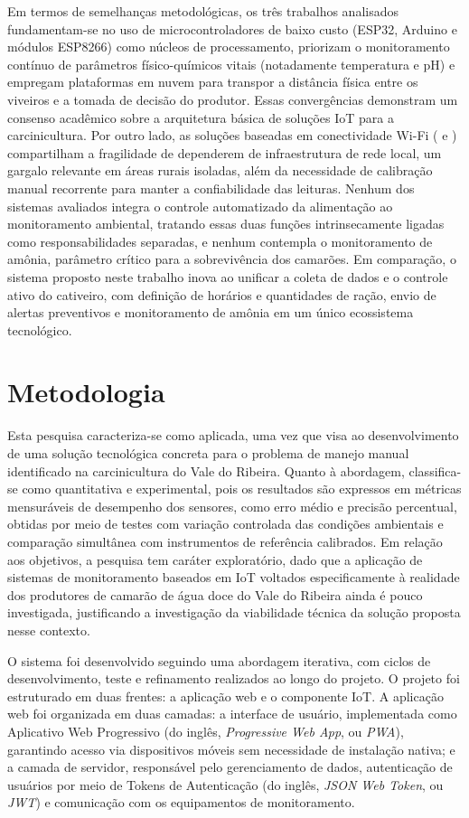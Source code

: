\documentclass[11pt,a4paper]{article}
\begin{document}
Em termos de semelhanças metodológicas, os três trabalhos analisados fundamentam-se no uso de microcontroladores de baixo custo (ESP32, Arduino e módulos ESP8266) como núcleos de processamento, priorizam o monitoramento contínuo de parâmetros físico-químicos vitais (notadamente temperatura e pH) e empregam plataformas em nuvem para transpor a distância física entre os viveiros e a tomada de decisão do produtor. Essas convergências demonstram um consenso acadêmico sobre a arquitetura básica de soluções IoT para a carcinicultura. Por outro lado, as soluções baseadas em conectividade Wi-Fi (\cite{Uddin2020} e \cite{Arifani2024}) compartilham a fragilidade de dependerem de infraestrutura de rede local, um gargalo relevante em áreas rurais isoladas, além da necessidade de calibração manual recorrente para manter a confiabilidade das leituras. Nenhum dos sistemas avaliados integra o controle automatizado da alimentação ao monitoramento ambiental, tratando essas duas funções intrinsecamente ligadas como responsabilidades separadas, e nenhum contempla o monitoramento de amônia, parâmetro crítico para a sobrevivência dos camarões. Em comparação, o sistema proposto neste trabalho inova ao unificar a coleta de dados e o controle ativo do cativeiro, com definição de horários e quantidades de ração, envio de alertas preventivos e monitoramento de amônia em um único ecossistema tecnológico.

\section{Metodologia}

Esta pesquisa caracteriza-se como aplicada, uma vez que visa ao desenvolvimento de uma solução tecnológica concreta para o problema de manejo manual identificado na carcinicultura do Vale do Ribeira. Quanto à abordagem, classifica-se como quantitativa e experimental, pois os resultados são expressos em métricas mensuráveis de desempenho dos sensores, como erro médio e precisão percentual, obtidas por meio de testes com variação controlada das condições ambientais e comparação simultânea com instrumentos de referência calibrados. Em relação aos objetivos, a pesquisa tem caráter exploratório, dado que a aplicação de sistemas de monitoramento baseados em IoT voltados especificamente à realidade dos produtores de camarão de água doce do Vale do Ribeira ainda é pouco investigada, justificando a investigação da viabilidade técnica da solução proposta nesse contexto.

O sistema foi desenvolvido seguindo uma abordagem iterativa, com ciclos de desenvolvimento, teste e refinamento realizados ao longo do projeto. O projeto foi estruturado em duas frentes: a aplicação web e o componente IoT. A aplicação web foi organizada em duas camadas: a interface de usuário, implementada como Aplicativo Web Progressivo (do inglês, \textit{Progressive Web App}, ou \textit{PWA}), garantindo acesso via dispositivos móveis sem necessidade de instalação nativa; e a camada de servidor, responsável pelo gerenciamento de dados, autenticação de usuários por meio de Tokens de Autenticação (do inglês, \textit{JSON Web Token}, ou \textit{JWT}) e comunicação com os equipamentos de monitoramento.
\end{document}
